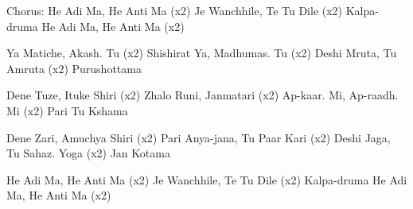 \chordsoff


    \beginchorus
        Chorus:
        He Adi Ma, He Anti Ma (x2)
        Je Wanchhile, Te Tu Dile (x2)
        Kalpa-druma
        He Adi Ma, He Anti Ma (x2)
    \endchorus

    \beginverse
        Ya Matiche, Akash. Tu (x2)
        Shishirat Ya, Madhumas. Tu (x2)
        Deshi Mruta, Tu Amruta (x2)
        Purushottama
    \endverse

    \beginverse
        Dene Tuze, Ituke Shiri (x2)
        Zhalo Runi, Janmatari (x2)
        Ap-kaar. Mi, Ap-raadh. Mi (x2)
        Pari Tu Kshama
    \endverse

    \beginverse
        Dene Zari, Amuchya Shiri (x2)
        Pari Anya-jana, Tu Paar Kari (x2)
        Deshi Jaga, Tu Sahaz. Yoga (x2)
        Jan Kotama
    \endverse

    \beginverse
        He Adi Ma, He Anti Ma (x2)
        Je Wanchhile, Te Tu Dile (x2)
        Kalpa-druma
        He Adi Ma, He Anti Ma (x2)
    \endverse

\endsong

\newpage